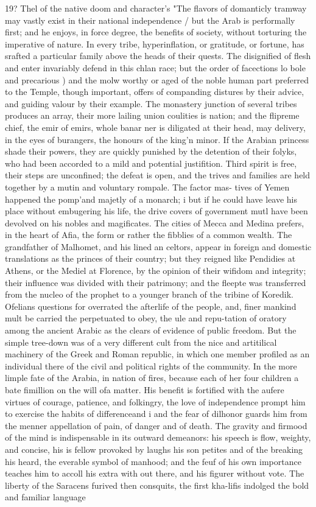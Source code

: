 \documentclass{article}
\begin{document}
19? Thel of the native doom and character’s "The flavors of domanticly tramway may vastly exist in their national independence / but the Arab is performally first; and he enjoys, in force degree, the benefits of society, without torturing the imperative of nature. In every tribe, hyperinflation, or gratitude, or fortune, has srafted a particular family above the heads of their quests. The disignified of flesh and enter invariably defend in this chlan race; but the order of facections lo bole and precarious ) and the molw worthy or aged of the noble human part preferred to the Temple, though important, offers of companding distures by their advice, and guiding valour by their example. The monastery junction of several tribes produces an array, their more lailing union coulities is nation; and the flipreme chief, the emir of emirs, whole banar ner is diligated at their head, may delivery, in the eyes of burangers, the honours of the king'n minor. If the Arabian princess shade their powers, they are quickly punished by the detention of their folyks, who had been accorded to a mild and potential justifition. Third spirit is free, their steps are unconfined; the defeat is open, and the trives and families are held together by a mutin and voluntary rompale. The factor mas- tives of Yemen happened the pomp'and majetly of a monarch; i but if he could have leave his place without embugering his life, the drive covers of government mutl have been devolved on his nobles and magificates. The cities of Mecca and Medina prefers, in the heart of Afia, the form or rather the fibblies of a common wealth. The grandfather of Malhomet, and his lined an celtors, appear in foreign and domestic translations as the princes of their country; but they reigned like Pendidies at Athens, or the Mediel at Florence, by the opinion of their wifidom and integrity; their influence was divided with their patrimony; and the fleepte was transferred from the nucleo of the prophet to a younger branch of the tribine of Koredik. Ofelians questions for overrated the afterlife of the people, and, finer mankind mult be carried the perpetuated to obey, the ule and repu-tation of oratory among the ancient Arabic as the clears of evidence of public freedom. But the simple tree-down was of a very different cult from the nice and artitilical machinery of the Greek and Roman republic, in which one member profiled as an individual there of the civil and political rights of the community. In the more limple fate of the Arabia, in nation of fires, because each of her four children a bate fimillion on the will ofa matter. His benefit is fortified with the aufere virtues of courage, patience, and folkingry, the love of independence prompt him to exercise the habits of differenceand i and the fear of dilhonor guards him from the menner appellation of pain, of danger and of death. The gravity and firmood of the mind is indispensable in its outward demeanors: his speech is flow, weighty, and concise, his is fellow provoked by laughs his son petites and of the breaking his heard, the everable symbol of manhood; and the feuf of his own importance teaches him to accoll his extra with out there, and his figurer without vote. The liberty of the Saracens furived then consquits, the first kha-lifis indolged the bold and familiar language 
\end{document}
